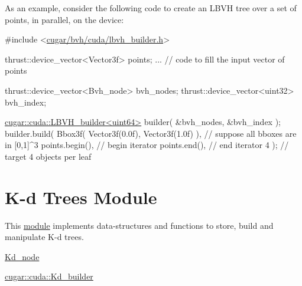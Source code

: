 \begin{DoxyParagraph}{}
As an example, consider the following code to create an L\+B\+VH tree over a set of points, in parallel, on the device\+: 
\begin{DoxyCode}
\textcolor{preprocessor}{#include <\hyperlink{lbvh__builder_8h}{cugar/bvh/cuda/lbvh\_builder.h}>}

thrust::device\_vector<Vector3f> points;
... \textcolor{comment}{// code to fill the input vector of points}

thrust::device\_vector<Bvh\_node> bvh\_nodes;
thrust::device\_vector<uint32>   bvh\_index;

\hyperlink{structcugar_1_1cuda_1_1_l_b_v_h__builder}{cugar::cuda::LBVH\_builder<uint64>} builder( &bvh\_nodes, &bvh\_index );
builder.build(
    Bbox3f( Vector3f(0.0f), Vector3f(1.0f) ),   \textcolor{comment}{// suppose all bboxes are in [0,1]^3}
    points.begin(),                             \textcolor{comment}{// begin iterator}
    points.end(),                               \textcolor{comment}{// end iterator}
    4 );                                        \textcolor{comment}{// target 4 objects per leaf}
\end{DoxyCode}
 
\end{DoxyParagraph}
\hypertarget{kd_page}{}\section{K-\/d Trees Module}\label{kd_page}
\begin{DoxyParagraph}{}
This \hyperlink{group__kdtree}{module} implements data-\/structures and functions to store, build and manipulate K-\/d trees.
\end{DoxyParagraph}

\begin{DoxyItemize}
\item \hyperlink{structcugar_1_1_kd__node}{Kd\+\_\+node}
\item \hyperlink{structcugar_1_1cuda_1_1_kd__builder}{cugar\+::cuda\+::\+Kd\+\_\+builder}
\end{DoxyItemize}

